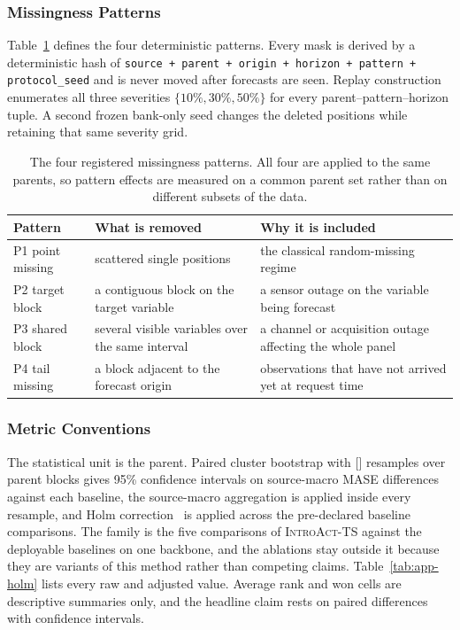 \documentclass{article}
\newcommand{\ph}[1]{\textcolor{phgray}{\textsf{[\detokenize{#1}]}}}
\newcommand{\introact}{\textsc{IntroAct-TS}}
\begin{document}
\subsubsection{Missingness Patterns}
\label{app:patterns}
Table~\ref{tab:app-patterns} defines the four deterministic patterns. Every mask is derived
by a deterministic hash of
\texttt{source + parent + origin + horizon + pattern + protocol\_seed} and is never moved
after forecasts are seen. Replay construction enumerates all three severities
$\{10\%, 30\%, 50\%\}$ for every parent--pattern--horizon tuple. A second frozen bank-only
seed changes the deleted positions while retaining that same severity grid.

\begin{table}[h]
  \caption{The four registered missingness patterns. All four are applied to the same parents,
  so pattern effects are measured on a common parent set rather than on different subsets of
  the data.}
  \label{tab:app-patterns}
  \centering
  \small
  \setlength{\tabcolsep}{4pt}
\begin{tabular}{@{}l p{} p{}@{}}
    \toprule
    Pattern & What is removed & Why it is included \\
    \midrule
    P1 point missing    & scattered single positions & the classical random-missing regime \\
    P2 target block     & a contiguous block on the target variable & a sensor outage on the variable being forecast \\
    P3 shared block     & several visible variables over the same interval & a channel or acquisition outage affecting the whole panel \\
    P4 tail missing     & a block adjacent to the forecast origin & observations that have not arrived yet at request time \\
    \bottomrule
  \end{tabular}
\end{table}

\subsubsection{Metric Conventions}
\label{app:metric-conventions}
The statistical unit is the parent. Paired cluster bootstrap with \ph{N_BOOTSTRAP} resamples
over parent blocks gives 95\% confidence intervals on source-macro MASE differences against
each baseline, the source-macro aggregation is applied inside every resample, and Holm
correction~\citep{holm1979simple} is applied across the pre-declared baseline comparisons.
The family is the five comparisons of \introact{} against the deployable baselines on one
backbone, and the ablations stay outside it because they are variants of this method rather
than competing claims. Table~\ref{tab:app-holm} lists every raw and adjusted value.
Average rank and won cells are descriptive summaries only, and the headline claim rests on
paired differences with confidence intervals.
\end{document}
